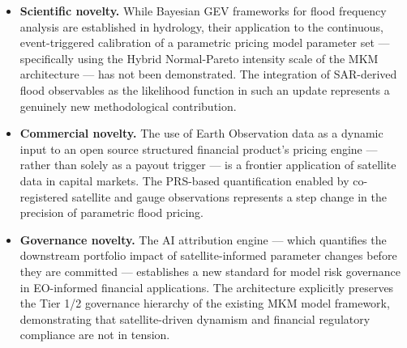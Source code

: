 \documentclass[11pt,a4paper]{article}
\begin{document}
\begin{itemize}
  \item \textbf{Scientific novelty.} While Bayesian GEV frameworks for flood
  frequency analysis are established in hydrology, their application to the
  continuous, event-triggered calibration of a parametric pricing model parameter
  set --- specifically using the Hybrid Normal-Pareto intensity scale of the MKM
  architecture --- has not been demonstrated. The integration of SAR-derived flood
  observables as the likelihood function in such an update represents a genuinely
  new methodological contribution.

  \item \textbf{Commercial novelty.} The use of Earth Observation data as a dynamic
  input to an open source structured financial product's pricing engine --- rather
  than solely as a payout trigger --- is a frontier application of satellite data in
  capital markets. The PRS-based quantification enabled by co-registered satellite
  and gauge observations represents a step change in the precision of parametric
  flood pricing.

  \item \textbf{Governance novelty.} The AI attribution engine --- which quantifies
  the downstream portfolio impact of satellite-informed parameter changes before
  they are committed --- establishes a new standard for model risk governance in
  EO-informed financial applications. The architecture explicitly preserves the
  Tier 1/2 governance hierarchy of the existing MKM model framework, demonstrating
  that satellite-driven dynamism and financial regulatory compliance are not in
  tension.
\end{itemize}

\mkmlimitations
\end{document}
